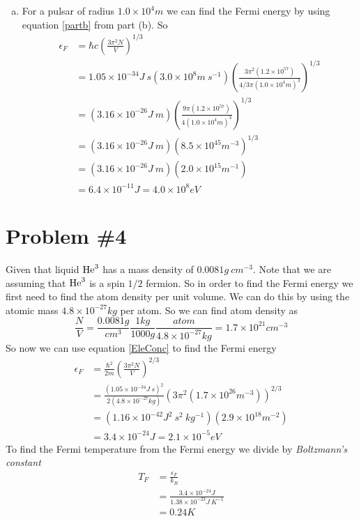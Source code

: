 \documentclass[11pt]{article}
\numberwithin{equation}{section}
\begin{document}
\begin{enumerate}[(a)]
\item
For a pulsar of radius $1.0\times10^{4}\unit{m}$ we can find the Fermi energy by using equation \ref{partb} from part (b). So 
\begin{align*}
\epsilon_F &= \hbar c \left(\frac{3\pi^2N}{V}\right)^{1/3}\\
&=  1.05\times10^{-34}\unit{J\ s}(3.0\times10^{8}\unit{m\ s^{-1}})\left(\frac{3\pi^2(1.2\times10^{57})}{4/3\pi(1.0\times10^4\unit{m})^3}\right)^{1/3}\\
&=  (3.16\times10^{-26}\unit{J\ m})\left(\frac{9\pi(1.2\times10^{57})}{4(1.0\times10^4\unit{m})^3}\right)^{1/3}\\
&=  (3.16\times10^{-26}\unit{J\ m})\left(8.5\times10^{45}\unit{m^{-3}}\right)^{1/3}\\
&=  (3.16\times10^{-26}\unit{J\ m})\left(2.0\times10^{15}\unit{m^{-1}}\right)\\
&=  6.4\times10^{-11}\unit{J} = 4.0\times10^{8}\unit{eV}
\end{align*}

\end{enumerate}
\section{Problem \#4}
Given that liquid $\textnormal{He}^3$ has a mass density of $0.0081\unit{g\ cm^{-3}}$. Note that we are assuming that $\textnormal{He}^3$ is a spin $1/2$ fermion. So in order to find the Fermi energy we first need to find the atom density per unit volume. We can do this by using the atomic mass $4.8\times10^{-27}\unit{kg}$ per atom. So we can find atom density as
$$\frac{N}{V} = \frac{0.0081\unit{g}}{\unit{cm^3}}\frac{1\unit{kg}}{1000\unit{g}}\frac{\unit{atom}}{4.8\times10^{-27}\unit{kg}} = 1.7\times10^{21}\unit{cm^{-3}}$$
So now we can use equation \ref{EleConc} to find the Fermi energy 
\begin{align*}
\epsilon_F &= \frac{\hbar^2}{2m} \left(\frac{3\pi^2N}{V}\right)^{2/3}\\
&= \frac{(1.05\times10^{-34}\unit{J\ s})^2}{2(4.8\times10^{-27}\unit{kg})}\left(3\pi^2(1.7\times10^{26}\unit{m^{-3}})\right)^{2/3}\\
&= (1.16\times10^{-42}\unit{J^2\ s^2\ kg^{-1}})(2.9\times10^{18}\unit{m^{-2}})\\
&= 3.4\times10^{-24}\unit{J} = 2.1\times10^{-5}\unit{eV}
\end{align*}
To find the Fermi temperature from the Fermi energy we divide by \emph{Boltzmann's constant}
\begin{align*}
T_F &= \frac{\epsilon_F}{k_B}\\
&= \frac{3.4\times10^{-24}\unit{J}}{1.38\times10^{-23}\unit{J\ K^{-1}}}\\
&= 0.24\unit{K}
\end{align*}
\end{document}
